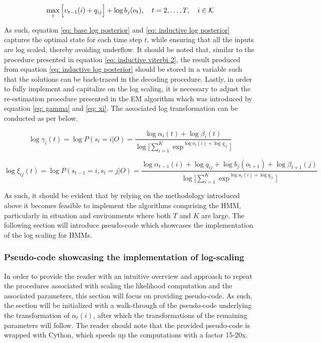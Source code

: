 \begin{equation}
    \max_{i} \Big[\upsilon_{t-1}(i) + q_{ij}\Big] + \log b_j(o_t),
    \quad t=2,\ldots,T,
    \quad i \in\operatorname{\mathcal{K}}
    \label{eq: inductive log posterior}
\end{equation}

As such, equation \ref{eq: base log posterior} and \ref{eq: inductive log posterior} captures the optimal state for each time step $t$, while ensuring that all the inputs are log scaled, thereby avoiding underflow. It should be noted that, similar to the procedure presented in equation \ref{eq: inductive viterbi 2}, the result produced from equation \ref{eq: inductive log posterior} should be stored in a variable such that the solutions can be back-traced in the decoding procedure. Lastly, in order to fully implement and capitalize on the log scaling, it is necessary to adjust the re-estimation procedure presented in the EM algorithm which was introduced by equation \ref{eq: gamma} and \ref{eq: xi}. The associated log transformation can be conducted as per below.

\begin{equation}
    \log\gamma_i(t) = \log P(s_t=i|O) =
    \frac{\log\alpha_i(t) + \log\beta_i(t)}{\log\Big[\sum_{i=1}^K \exp^{\log a_t(i)+\log q_{ij}}\Big]}  
    \label{eq: log gamma}
\end{equation}

\begin{equation}
    \log\xi_{ij}(t) = \log P(s_{t-1}=i, s_t=j|O) =
    \frac{\log\alpha_{t-1}(i) + \log q_{ij} + \log b_j(o_{t+1}) + \log \beta_{t+1}(j)}{\log\Big[\sum_{i=1}^K \exp^{\log a_t(i)+\log q_{ij}}\Big]}
    \label{eq: log xi}
\end{equation}

As such, it should be evident that by relying on the methodology introduced above it becomes feasible to implement the algorithms comprising the HMM, particularly in situation and environments where both $T$ and $K$ are large. The following section will introduce pseudo-code which showcases the implementation of the log scaling for HMMs. 

\subsubsection{Pseudo-code showcasing the implementation of log-scaling}
In order to provide the reader with an intuitive overview and approach to repeat the procedures associated with scaling the likelihood computation and the associated parameters, this section will focus on providing pseudo-code. As such, the section will be initialized with a walk-through of the pseudo-code underlying the transformation of $\alpha_t(i)$, after which the transformations of the remaining parameters will follow. The reader should note that the provided pseudo-code is wrapped with Cython, which speeds up the computations with a factor 15-20x.

